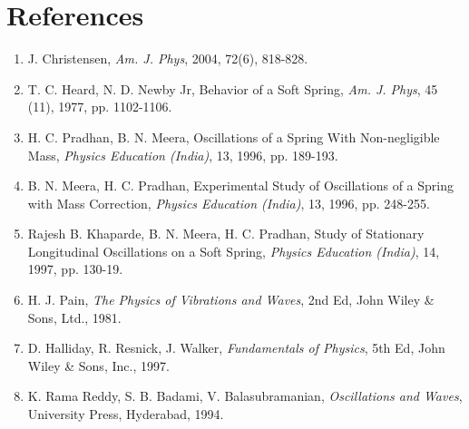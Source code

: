 \section*{References}

\begin{enumerate}
\itemsep0em
\item J. Christensen, \textit{Am. J. Phys}, 2004, 72(6), 818-828.

\item T. C. Heard, N. D. Newby Jr, Behavior of a Soft Spring, \textit{Am. J. Phys}, 45 (11), 1977,
pp. 1102-1106. 

\item H. C. Pradhan, B. N. Meera, Oscillations of a Spring With Non-negligible Mass, \textit{Physics Education (India)}, 13, 1996, pp. 189-193.

\item B. N. Meera, H. C. Pradhan, Experimental Study of Oscillations of a Spring with Mass Correction, \textit{Physics Education (India)}, 13, 1996, pp. 248-255.

\item Rajesh B. Khaparde, B. N. Meera, H. C. Pradhan, Study of Stationary Longitudinal Oscillations on a Soft Spring, \textit{Physics Education (India)}, 14, 1997, pp. 130-19. 

\item H. J. Pain, \textit{The Physics of Vibrations and Waves}, 2nd Ed, John Wiley \& Sons, Ltd., 1981.

\item D. Halliday, R. Resnick, J. Walker, \textit{Fundamentals of Physics}, 5th Ed, John Wiley \& Sons, Inc., 1997.

\item K. Rama Reddy, S. B. Badami, V. Balasubramanian, \textit{Oscillations and Waves}, University
Press, Hyderabad, 1994.
\end{enumerate}
